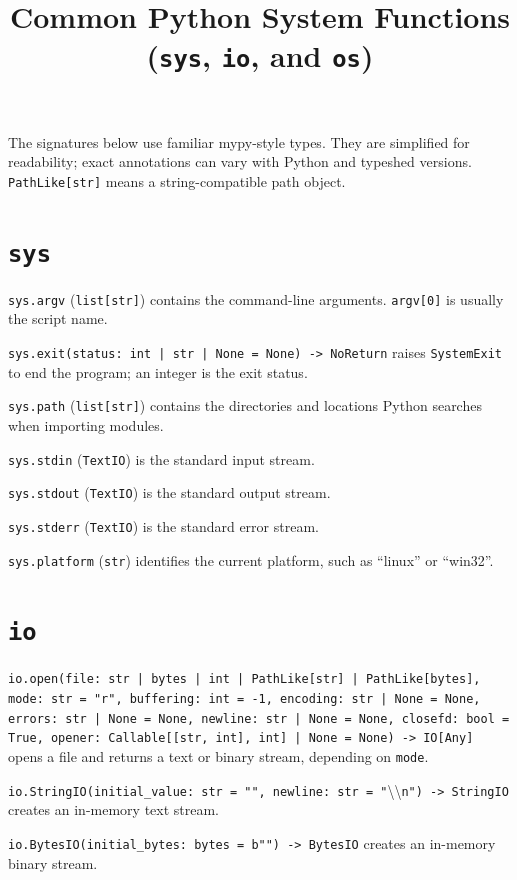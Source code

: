 \documentclass[11pt]{article}
\title{Common Python System Functions (\texttt{sys}, \texttt{io}, and \texttt{os})}
\date{}
\begin{document}
\maketitle

The signatures below use familiar mypy-style types. They are simplified for readability; exact annotations can vary with Python and typeshed versions. \texttt{PathLike[str]} means a string-compatible path object.

\section{\texttt{sys}}

\texttt{sys.argv} (\texttt{list[str]}) contains the command-line arguments. \texttt{argv[0]} is usually the script name.

\texttt{sys.exit(status: int | str | None = None) -> NoReturn} raises \texttt{SystemExit} to end the program; an integer is the exit status.

\texttt{sys.path} (\texttt{list[str]}) contains the directories and locations Python searches when importing modules.

\texttt{sys.stdin} (\texttt{TextIO}) is the standard input stream.

\texttt{sys.stdout} (\texttt{TextIO}) is the standard output stream.

\texttt{sys.stderr} (\texttt{TextIO}) is the standard error stream.

\texttt{sys.platform} (\texttt{str}) identifies the current platform, such as ``linux'' or ``win32''.

\section{\texttt{io}}

\texttt{io.open(file: str | bytes | int | PathLike[str] | PathLike[bytes], mode: str = "r", buffering: int = -1, encoding: str | None = None, errors: str | None = None, newline: str | None = None, closefd: bool = True, opener: Callable[[str, int], int] | None = None) -> IO[Any]} opens a file and returns a text or binary stream, depending on \texttt{mode}.

\texttt{io.StringIO(initial\_value: str = "", newline: str = "}\textbackslash{}\textbackslash{}\texttt{n") -> StringIO} creates an in-memory text stream.

\texttt{io.BytesIO(initial\_bytes: bytes = b"") -> BytesIO} creates an in-memory binary stream.
\end{document}
